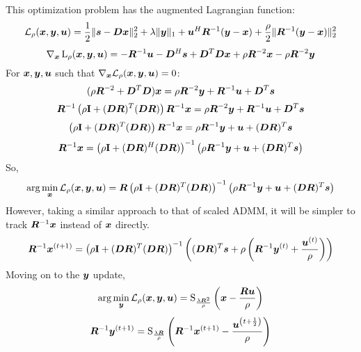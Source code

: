 This optimization problem has the augmented Lagrangian function:
%
\begin{equation}
\mathcal{L}_{\rho}(\bm{x},\bm{y},\bm{u}) = \frac{1}{2}\|\bm{s} - \bm{D}\bm{x}\|_2^2 + \lambda\|\bm{y}\|_1 + \bm{u}^H\bm{R}^{-1}(\bm{y} - \bm{x})  + \frac{\rho}{2}\|\bm{R}^{-1}(\bm{y} - \bm{x})\|_2^2
\end{equation} 
%
\begin{equation}
\nabla_{\bm{x}}\operatorname{L}_{\rho}(\bm{x},\bm{y},\bm{u}) = -\bm{R}^{-1}\bm{u} - \bm{D}^H\bm{s} + \bm{D}^T\bm{D}\bm{x} + \rho\bm{R}^{-2}\bm{x} - \rho\bm{R}^{-2}\bm{y}
\end{equation}
%
For $\bm{x},\bm{y},\bm{u}$ such that $\nabla_{\bm{x}}\mathcal{L}_{\rho}(\bm{x},\bm{y},\bm{u}) = 0$:
%
\begin{equation}
(\rho\bm{R}^{-2} + \bm{D}^T\bm{D})\bm{x} = \rho\bm{R}^{-2}\bm{y} + \bm{R}^{-1} \bm{u} + \bm{D}^T\bm{s}
\end{equation}
%
\begin{equation}
\bm{R}^{-1}\left(\rho{\bf I} + (\bm{D}\bm{R})^T(\bm{D}\bm{R})\right)\bm{R}^{-1}\bm{x} = \rho\bm{R}^{-2}\bm{y} + \bm{R}^{-1}\bm{u} + \bm{D}^T\bm{s}
\end{equation}
%
\begin{equation}
\left(\rho{\bf I} + (\bm{D}\bm{R})^T(\bm{D}\bm{R})\right)\bm{R}^{-1}\bm{x} = \rho\bm{R}^{-1}\bm{y} + \bm{u} + (\bm{D}\bm{R})^T\bm{s}
\end{equation}
%
\begin{equation}
\bm{R}^{-1}\bm{x} = \left(\rho{\bf I} + (\bm{D}\bm{R})^H(\bm{D}\bm{R})\right)^{-1}\left(\rho\bm{R}^{-1}\bm{y} + \bm{u} + (\bm{D}\bm{R})^T\bm{s}\right)
\end{equation}
%
So,
%
\begin{equation}
\arg\min_{\bm{x}} \mathcal{L}_{\rho}(\bm{x},\bm{y},\bm{u}) = \bm{R}\left(\rho{\bf I} + (\bm{D}\bm{R})^T(\bm{D}\bm{R})\right)^{-1}\left(\rho\bm{R}^{-1}\bm{y} + \bm{u} + (\bm{D}\bm{R})^T\bm{s}\right)
\end{equation}
%
However, taking a similar approach to that of scaled ADMM, it will be simpler to track $\bm{R}^{-1}\bm{x}$ instead of $\bm{x}$ directly.
%
\begin{equation}
\bm{R}^{-1}\bm{x}^{(t + 1)} = \left(\rho{\bf I} + (\bm{D}\bm{R})^T(\bm{D}\bm{R})\right)^{-1}\left((\bm{D}\bm{R})^T\bm{s} + \rho\left(\bm{R}^{-1}\bm{y}^{(t)} + \frac{\bm{u}^{(t)}}{\rho}\right)\right)
\end{equation}
%
Moving on to the $\bm{y}$ update,
%
\begin{equation}
\arg\min_{\bm{y}} \mathcal{L}_{\rho}(\bm{x},\bm{y},\bm{u}) = \operatorname{S}_{\frac{\lambda\bm{R}^2}{\rho}}\left(\bm{x} - \frac{\bm{R}\bm{u}}{\rho}\right)
\end{equation}
%
\begin{equation}
\bm{R}^{-1}\bm{y}^{(t + 1)}= \operatorname{S}_{\frac{\lambda\bm{R}}{\rho}}\left(\bm{R}^{-1}\bm{x}^{(t + 1)} - \frac{\bm{u}^{\left(t + \frac{1}{2}\right)}}{\rho}\right)
\end{equation}

